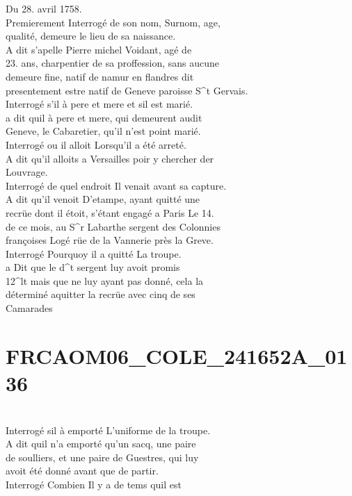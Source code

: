 \documentclass{article}
\begin{document}
\begin{pages}
Du 28. avril 1758.\\
Premierement Interrogé de son nom, Surnom, age,\\
qualité, demeure le lieu de sa naissance.\\
A dit s'apelle Pierre michel Voidant, agé de\\
23. ans, charpentier de sa proffession, sans aucune\\
demeure fine, natif de namur en flandres dit\\
presentement estre natif de Geneve paroisse S\^{}t Gervais.\\
Interrogé s'il à pere et mere et sil est marié.\\
a dit quil à pere et mere, qui demeurent audit\\
Geneve, le Cabaretier, qu'il n'est point marié.\\
Interrogé ou il alloit Lorsqu'il a été arreté.\\
A dit qu'il alloits a Versailles poir y chercher der\\
Louvrage.\\
Interrogé de quel endroit Il venait avant sa capture.\\
A dit qu'il venoit D'etampe, ayant quitté une\\
recrüe dont il étoit, s'étant engagé a Paris Le 14.\\
de ce mois, au S\^{}r Labarthe sergent des Colonnies\\
françoises Logé rüe de la Vannerie près la Greve.\\
Interrogé Pourquoy il a quitté La troupe.\\
a Dit que le d\^{}t sergent luy avoit promis\\
12\^{}lt mais que ne luy ayant pas donné, cela la\\
déterminé aquitter la recrüe avec cinq de ses\\
Camarades
\pend
\endnumbering\beginnumbering\section{FRCAOM06\_COLE\_241652A\_0136}\pstart
\\
Interrogé sil à emporté L'uniforme de la troupe.\\
A dit quil n'a emporté qu'un sacq, une paire\\
de soulliers, et une paire de Guestres, qui luy\\
avoit été donné avant que de partir.\\
Interrogé Combien Il y a de tems quil est\\

\end{pages}
\end{document}
